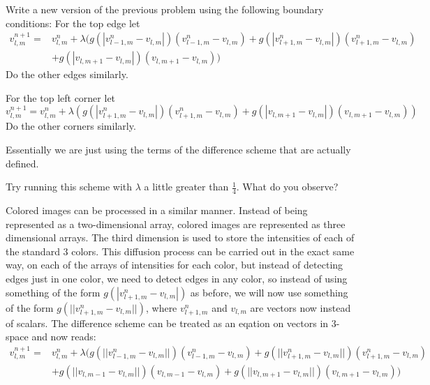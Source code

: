 \begin{problem}
Write a new version of the previous problem using the following boundary conditions:
For the top edge let 
\begin{equation*}
\begin{split}
v_{l,m}^{n+1} =& v_{l,m}^n + \lambda (g(|v_{l-1,m}^n - v_{l,m}|)(v_{l-1,m}^n - v_{l,m}) + g(|v_{l+1,m}^n - v_{l,m}|)(v_{l+1,m}^n - v_{l,m}) \\
 &+ g(|v_{l,m+1} - v_{l,m}|)(v_{l,m+1} - v_{l,m}))
\end{split}
\end{equation*}
Do the other edges similarly.

For the top left corner let
\begin{equation*}
v_{l,m}^{n+1} = v_{l,m}^n + \lambda (g(|v_{l+1,m}^n - v_{l,m}|)(v_{l+1,m}^n - v_{l,m}) + g(|v_{l,m+1} - v_{l,m}|)(v_{l,m+1} - v_{l,m}))
\end{equation*}
Do the other corners similarly.

Essentially we are just using the terms of the difference scheme that are actually defined.

Try running this scheme with $\lambda$ a little greater than $\frac{1}{4}$. What do you observe?
\end{problem}

Colored images can be processed in a similar manner.
Instead of being represented as a two-dimensional array, colored images are represented as three dimensional arrays.
The third dimension is used to store the intensities of each of the standard 3 colors.
This diffusion process can be carried out in the exact same way, on each of the arrays of intensities for each color, but instead of detecting edges just in one color, we need to detect edges in any color, so instead of using something of the form $g(|v_{l+1,m}^n - v_{l,m}|)$ as before, we will now use something of the form $g(||v_{l+1,m}^n - v_{l,m}||)$, where $v_{l+1,m}^n$ and $v_{l,m}$ are vectors now instead of scalars.
The difference scheme can be treated as an eqation on vectors in 3-space and now reads:
\begin{equation*}
\begin{split}
v_{l,m}^{n+1} =& v_{l,m}^n + \lambda (g(||v_{l-1,m}^n - v_{l,m}||)(v_{l-1,m}^n - v_{l,m}) + g(||v_{l+1,m}^n - v_{l,m}||)(v_{l+1,m}^n - v_{l,m}) \\
 &+ g(||v_{l,m-1} - v_{l,m}||)(v_{l,m-1} - v_{l,m}) + g(||v_{l,m+1} - v_{l,m}||)(v_{l,m+1} - v_{l,m}))
\end{split}
\end{equation*}

